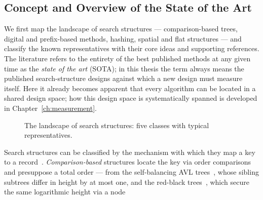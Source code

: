\begin{nurlang}
\section{Concept and Overview of the State of the Art}\label{sec:overview}
We first map the landscape of search structures --- comparison-based trees, digital and prefix-based methods,
hashing, spatial and flat structures --- and classify the known representatives with their core ideas and
supporting references. The literature refers to the entirety of the best published methods at any given
time as the \emph{state of the art} (SOTA); in this thesis the term always means the published
search-structure designs against which a new design must measure itself. Here it
already becomes apparent that every algorithm can be located in a shared design space; how this design
space is systematically spanned is developed in Chapter~\ref{ch:measurement}.
\begin{figure}[htbp]\centering
{}
\caption{The landscape of search structures: five classes with typical representatives.}\label{fig:search-map}
\end{figure}
Search structures can be classified by the mechanism with which they map a key to a
record~\cite{knuth1998taocp3}\@. \emph{Comparison-based} structures locate the key via order comparisons
and presuppose a total order --- from the self-balancing AVL trees~\cite{adelsonvelsky1962avl}, whose
sibling subtrees differ in height by at most one, and the red-black
trees~\cite{bayer1972symmetric,guibas1978redblack}, which secure the same logarithmic height via a node

\end{nurlang}
